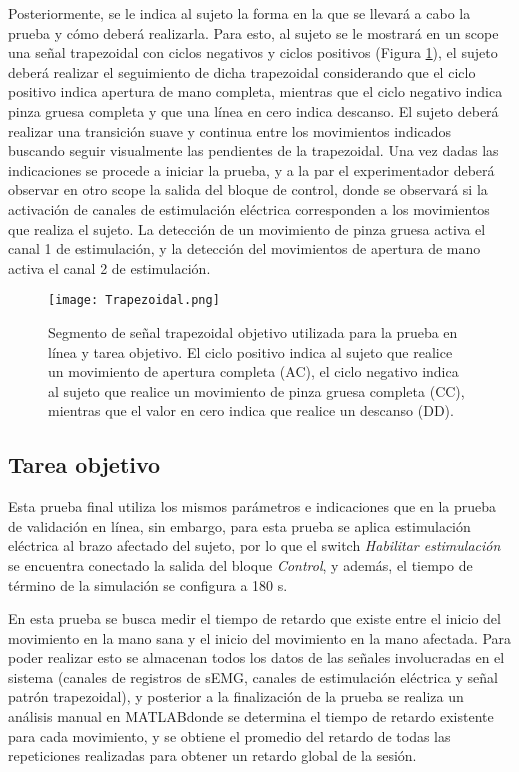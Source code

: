 Posteriormente, se le indica al sujeto la forma en la que se llevará a cabo la prueba y cómo deberá realizarla. Para esto, al sujeto se le mostrará en un scope una señal trapezoidal con ciclos negativos y ciclos positivos (Figura \ref{Figura: Trapezoidal}), el sujeto deberá realizar el seguimiento de dicha trapezoidal considerando que el ciclo positivo indica apertura de mano completa, mientras que el ciclo negativo indica pinza gruesa completa y que una línea en cero indica descanso. El sujeto deberá realizar una transición suave y continua entre los movimientos indicados buscando seguir visualmente las pendientes de la trapezoidal. Una vez dadas las indicaciones se procede a iniciar la prueba, y a la par el experimentador deberá observar en otro scope la salida del bloque de control, donde se observará si la activación de canales de estimulación eléctrica corresponden a los movimientos que realiza el sujeto. La detección de un movimiento de pinza gruesa activa el canal 1 de estimulación, y la detección del movimientos de apertura de mano activa el canal 2 de estimulación.

\begin{figure}
	\centering
	\texttt{[image: Trapezoidal.png]}
	\caption[Señal trapezoidal objetivo]{Segmento de señal trapezoidal objetivo utilizada para la prueba en línea y tarea objetivo. El ciclo positivo indica al sujeto que realice un movimiento de apertura completa (AC), el ciclo negativo indica al sujeto que realice un movimiento de pinza gruesa completa (CC), mientras que el valor en cero indica que realice un descanso (DD).}
	\label{Figura: Trapezoidal}
\end{figure}

\newpage
\subsection{Tarea objetivo}\label{Sec: TareaObj}
Esta prueba final utiliza los mismos parámetros e indicaciones que en la prueba de validación en línea, sin embargo, para esta prueba se aplica estimulación eléctrica al brazo afectado del sujeto, por lo que el switch \emph{Habilitar estimulación} se encuentra conectado la salida del bloque \emph{Control}, y además, el tiempo de término de la simulación se configura a 180 s.

En esta prueba se busca medir el tiempo de retardo que existe entre el inicio del movimiento en la mano sana y el inicio del movimiento en la mano afectada. Para poder realizar esto se almacenan todos los datos de las señales involucradas en el sistema (canales de registros de sEMG, canales de estimulación eléctrica y señal patrón trapezoidal), y posterior a la finalización de la prueba se realiza un análisis manual en MATLAB\textregistered donde se determina el tiempo de retardo existente para cada movimiento, y se obtiene el promedio del retardo de todas las repeticiones realizadas para obtener un retardo global de la sesión.

